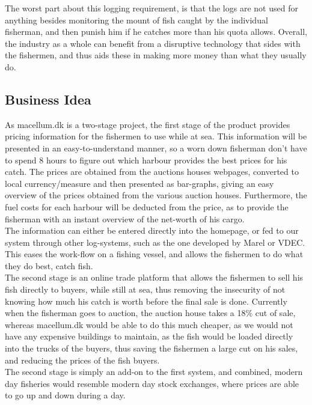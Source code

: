 \documentclass[12pt]{article}
\begin{document}
The worst part about this logging requirement, is that the logs are not used for anything besides monitoring the mount of fish caught by the individual fisherman, and then punish him if he catches more than his quota allows. Overall, the industry as a whole can benefit from a disruptive technology that sides with the fishermen, and thus aids these in making more money than what they usually do. 

\subsection{Business Idea}
As macellum.dk is a two-stage project, the first stage of the product provides pricing information for the fishermen to use while at sea. This information will be presented in an easy-to-understand manner, so a worn down fisherman don't have to spend 8 hours to figure out which harbour provides the best prices for his catch. The prices are obtained from the auctions houses webpages, converted to local currency/measure and then presented as bar-graphs, giving an easy overview of the prices obtained from the various auction houses. Furthermore, the fuel costs for each harbour will be deducted from the price, as to provide the fisherman with an instant overview of the net-worth of his cargo.\\

The information can either be entered directly into the homepage, or fed to our system through other log-systems, such as the one developed by Marel or VDEC. This eases the work-flow on a fishing vessel, and allows the fishermen to do what they do best, catch fish.\\

The second stage is an online trade platform that allows the fishermen to sell his fish directly to buyers, while still at sea, thus removing the insecurity of not knowing how much his catch is worth before the final sale is done. Currently when the fisherman goes to auction, the auction house takes a 18\% cut of sale, whereas macellum.dk would be able to do this much cheaper, as we would not have any expensive buildings to maintain, as the fish would be loaded directly into the trucks of the buyers, thus saving the fishermen a large cut on his sales, and reducing the prices of the fish buyers.\\

The second stage is simply an add-on to the first system, and combined, modern day fisheries would resemble modern day stock exchanges, where prices are able to go up and down during a day.
\end{document}
